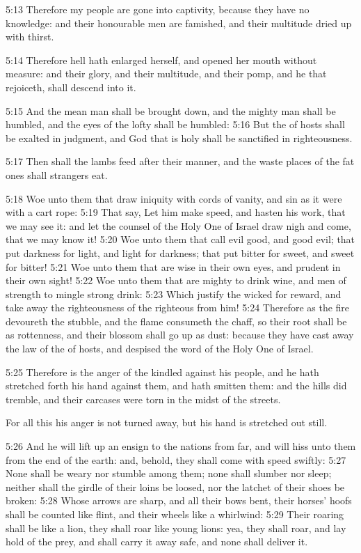 5:13 Therefore my people are gone into captivity, because they have no
knowledge: and their honourable men are famished, and their multitude
dried up with thirst.

5:14 Therefore hell hath enlarged herself, and opened her mouth
without measure: and their glory, and their multitude, and their pomp,
and he that rejoiceth, shall descend into it.

5:15 And the mean man shall be brought down, and the mighty man shall
be humbled, and the eyes of the lofty shall be humbled: 5:16 But the
\LORD of hosts shall be exalted in judgment, and God that is holy shall
be sanctified in righteousness.

5:17 Then shall the lambs feed after their manner, and the waste
places of the fat ones shall strangers eat.

5:18 Woe unto them that draw iniquity with cords of vanity, and sin as
it were with a cart rope: 5:19 That say, Let him make speed, and
hasten his work, that we may see it: and let the counsel of the Holy
One of Israel draw nigh and come, that we may know it!  5:20 Woe unto
them that call evil good, and good evil; that put darkness for light,
and light for darkness; that put bitter for sweet, and sweet for
bitter!  5:21 Woe unto them that are wise in their own eyes, and
prudent in their own sight!  5:22 Woe unto them that are mighty to
drink wine, and men of strength to mingle strong drink: 5:23 Which
justify the wicked for reward, and take away the righteousness of the
righteous from him!  5:24 Therefore as the fire devoureth the stubble,
and the flame consumeth the chaff, so their root shall be as
rottenness, and their blossom shall go up as dust: because they have
cast away the law of the \LORD of hosts, and despised the word of the
Holy One of Israel.

5:25 Therefore is the anger of the \LORD kindled against his people,
and he hath stretched forth his hand against them, and hath smitten
them: and the hills did tremble, and their carcases were torn in the
midst of the streets.

For all this his anger is not turned away, but his hand is stretched
out still.

5:26 And he will lift up an ensign to the nations from far, and will
hiss unto them from the end of the earth: and, behold, they shall come
with speed swiftly: 5:27 None shall be weary nor stumble among them;
none shall slumber nor sleep; neither shall the girdle of their loins
be loosed, nor the latchet of their shoes be broken: 5:28 Whose arrows
are sharp, and all their bows bent, their horses' hoofs shall be
counted like flint, and their wheels like a whirlwind: 5:29 Their
roaring shall be like a lion, they shall roar like young lions: yea,
they shall roar, and lay hold of the prey, and shall carry it away
safe, and none shall deliver it.

